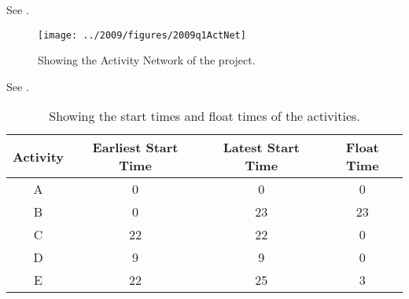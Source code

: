 %
%

\begin{subquestions}


\subquestion

See .
\begin{figure}
	\begin{center}
		\texttt{[image: ../2009/figures/2009q1ActNet]}
		\caption{\label{2001:q1:fig:ActNet} Showing the Activity Network of the project.}
	\end{center}
\end{figure}


\subquestion

See .
\begin{table}[ht]
	\centering
	\begin{tabular}{|c|c|c|c|}
		\hline
		Activity & Earliest Start Time & Latest Start Time & Float Time \\
		\hline
		A & 0 & 0 & 0 \\
		B & 0 & 23 & 23 \\ 
		C & 22 & 22 & 0 \\
		D & 9 & 9 & 0 \\
		E & 22 & 25 & 3 \\
		\hline
	\end{tabular}
	\caption{\label{2009:q1:tab:CritPath} Showing the start times and float times of the activities.}
\end{table}



\end{subquestions}
